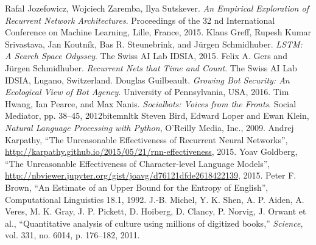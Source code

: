 \documentclass[12pt]{article}
\begin{document}
	\begin{thebibliography}{99}
		Rafal Jozefowicz, Wojciech Zaremba, Ilya Sutskever.
		\textit{An Empirical Exploration of Recurrent Network Architectures}.
		Proceedings of the 32 nd International Conference on Machine Learning, Lille, France, 2015.
		Klaus Greff, Rupesh Kumar Srivastava, Jan Koutn\'{i}k, Bas R. Steunebrink, and J\"{u}rgen Schmidhuber.
		\textit{LSTM: A Search Space Odyssey}.
		The Swiss AI Lab IDSIA, 2015.
		Felix A. Gers and J\"{u}rgen Schmidhuber.
		\textit{Recurrent Nets that Time and Count}.
		The Swiss AI Lab IDSIA, Lugano, Switzerland.
		Douglas Guilbeault.
		\textit{Growing Bot Security: An Ecological View of Bot Agency}.
		University of Pennsylvania, USA, 2016.
		Tim Hwang, Ian Pearce, and Max Nanis.
		\textit{Socialbots: Voices from the Fronts}.
		Social Mediator, pp. 38–45, 2012bitem{nltk}
        Steven Bird, Edward Loper and Ewan Klein,
        \emph{Natural Language Processing with Python},
        O'Reilly Media, Inc.,
        2009.
            Andrej Karpathy,
            ``The Unreasonable Effectiveness of Recurrent Neural Networks'',
            \url{http://karpathy.github.io/2015/05/21/rnn-effectiveness},
            2015.
            Yoav Goldberg,
            ``The Unreasonable Effectiveness of Character-level Language Models'',
            \url{http://nbviewer.jupyter.org/gist/joavg/d76121dfde2618422139},
            2015.
            Peter F. Brown,
            ``An Estimate of an Upper Bound for the Entropy of English'',
            Computational Linguistics 18.1,
            1992.
        J.-B. Michel, Y. K. Shen, A. P. Aiden, A. Veres, M. K. Gray, J. P. Pickett, D. Hoiberg, D. Clancy, P. Norvig, J. Orwant et al., ``Quantitative analysis of culture using millions of digitized books,'' \textit{Science}, vol. 331, no. 6014, p. 176–182, 2011.

	\end{thebibliography}
\end{document}
